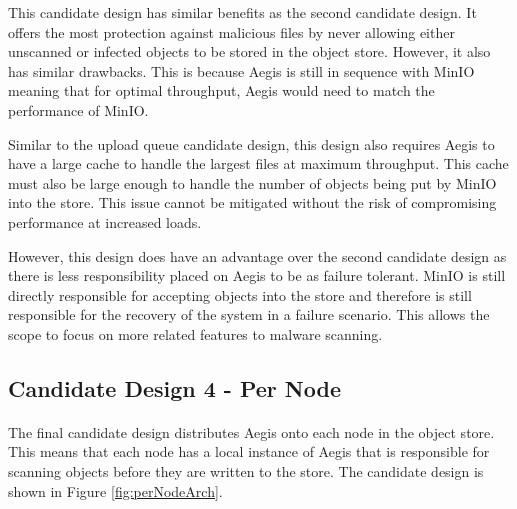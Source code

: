 \documentclass[12pt, conference, final, a4paper, onecolumn, compsoc]{IEEEtran}
\begin{document}
This candidate design has similar benefits as the second candidate design. It
offers the most protection against malicious files by never allowing either
unscanned or infected objects to be stored in the object store. However, it also
has similar drawbacks. This is because Aegis is still in sequence with MinIO
meaning that for optimal throughput, Aegis would need to match the performance
of MinIO.

Similar to the upload queue candidate design, this design also requires Aegis to
have a large cache to handle the largest files at maximum throughput. This cache
must also be large enough to handle the number of objects being put by MinIO
into the store. This issue cannot be mitigated without the risk of compromising
performance at increased loads.

However, this design does have an advantage over the second candidate design as
there is less responsibility placed on Aegis to be as failure tolerant. MinIO is
still directly responsible for accepting objects into the store and therefore is
still responsible for the recovery of the system in a failure scenario. This
allows the scope to focus on more related features to malware scanning.

\subsection{Candidate Design 4 - Per Node}
\paragraph{}

The final candidate design distributes Aegis onto each node in the object store.
This means that each node has a local instance of Aegis that is responsible for
scanning objects before they are written to the store. The candidate design is
shown in Figure \ref{fig:perNodeArch}.
\end{document}
